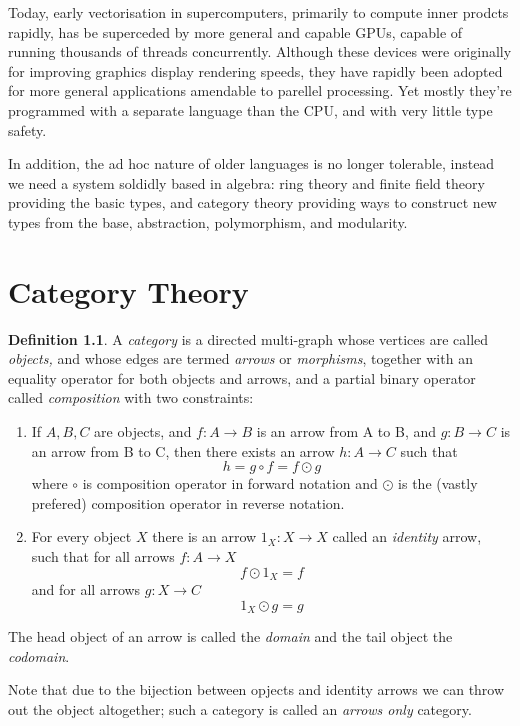 \documentclass[oneside]{book}
\theoremstyle{plain}
\theoremstyle{definition}
\newtheorem{definition}{Definition}
\theoremstyle{plain}
\begin{document}
Today, early vectorisation in supercomputers, primarily to compute
inner prodcts rapidly, has be superceded by more general and 
capable GPUs, capable of running thousands of threads concurrently.
Although these devices were originally for improving graphics display
rendering speeds, they have rapidly been adopted for more general
applications amendable to parellel processing. Yet mostly they're
programmed with a separate language than the CPU, and with very
little type safety.

\begin{ycomment}
In addition, the ad hoc nature of older languages is no longer tolerable,
instead we need a system soldidly based in algebra: ring theory and finite field
theory providing the basic types, and category theory providing ways to
construct new types from the base, abstraction, polymorphism, and modularity.
\end{ycomment}


\chapter{Category Theory}
\begin{definition}
A {\em category} is a directed multi-graph whose vertices are called {\em objects,}
and whose edges are termed {\em arrows} or {\em morphisms},
together with an equality operator for both objects and arrows,
and a partial binary operator called {\em composition} with two
constraints:
\begin{enumerate}
\item If $A,B,C$ are objects, and $f:A\rightarrow B$ is an arrow
from A to B, and $g:B\rightarrow C$ is an arrow from B to C,
then there exists an arrow $h:A\rightarrow C$ such that
$$h = g \circ f = f \odot g$$
where $\circ$ is composition operator in forward notation and $\odot$
is the (vastly prefered) composition operator in reverse notation.
\item For every object $X$ there is an arrow $1_X:X\rightarrow X$
called an {\em identity} arrow, such that for all arrows $f:A\rightarrow X$
$$f \odot 1_X = f$$
and for all arrows $g:X\rightarrow C$
$$1_X \odot g = g$$
\end{enumerate}
The head object of an arrow is called the {\em domain} and the tail
object the {\em codomain}.

Note that due to the bijection between opjects and identity arrows
we can throw out the object altogether; such a category is called
an {\em arrows only} category. 
\end{definition}
\end{document}
